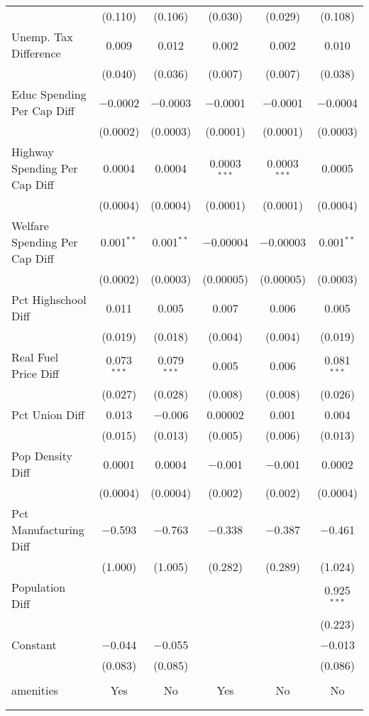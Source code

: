 \begin{table}[!htbp]
\begin{tabular}{@{\extracolsep{5pt}}lccccc}
  & (0.110) & (0.106) & (0.030) & (0.029) & (0.108) \\ 
  Unemp. Tax Difference & 0.009 & 0.012 & 0.002 & 0.002 & 0.010 \\ 
  & (0.040) & (0.036) & (0.007) & (0.007) & (0.038) \\ 
  Educ Spending Per Cap Diff & $-$0.0002 & $-$0.0003 & $-$0.0001 & $-$0.0001 & $-$0.0004 \\ 
  & (0.0002) & (0.0003) & (0.0001) & (0.0001) & (0.0003) \\ 
  Highway Spending Per Cap Diff & 0.0004 & 0.0004 & 0.0003$^{***}$ & 0.0003$^{***}$ & 0.0005 \\ 
  & (0.0004) & (0.0004) & (0.0001) & (0.0001) & (0.0004) \\ 
  Welfare Spending Per Cap Diff & 0.001$^{**}$ & 0.001$^{**}$ & $-$0.00004 & $-$0.00003 & 0.001$^{**}$ \\ 
  & (0.0002) & (0.0003) & (0.00005) & (0.00005) & (0.0003) \\ 
  Pct Highschool Diff & 0.011 & 0.005 & 0.007 & 0.006 & 0.005 \\ 
  & (0.019) & (0.018) & (0.004) & (0.004) & (0.019) \\ 
  Real Fuel Price Diff & 0.073$^{***}$ & 0.079$^{***}$ & 0.005 & 0.006 & 0.081$^{***}$ \\ 
  & (0.027) & (0.028) & (0.008) & (0.008) & (0.026) \\ 
  Pct Union Diff & 0.013 & $-$0.006 & 0.00002 & 0.001 & 0.004 \\ 
  & (0.015) & (0.013) & (0.005) & (0.006) & (0.013) \\ 
  Pop Density Diff & 0.0001 & 0.0004 & $-$0.001 & $-$0.001 & 0.0002 \\ 
  & (0.0004) & (0.0004) & (0.002) & (0.002) & (0.0004) \\ 
  Pct Manufacturing Diff & $-$0.593 & $-$0.763 & $-$0.338 & $-$0.387 & $-$0.461 \\ 
  & (1.000) & (1.005) & (0.282) & (0.289) & (1.024) \\ 
  Population Diff &  &  &  &  & 0.925$^{***}$ \\ 
  &  &  &  &  & (0.223) \\ 
  Constant & $-$0.044 & $-$0.055 &  &  & $-$0.013 \\ 
  & (0.083) & (0.085) &  &  & (0.086) \\ 
 \hline \\[-1.8ex] 
amenities & Yes & No & Yes & No & No \\ 
\hline \\[-1.8ex] 
\hline 
\hline \\[-1.8ex] 
\end{tabular} 
\end{table} 
